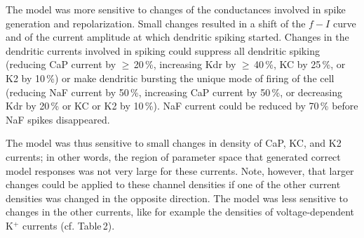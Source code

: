 \documentclass[12pt]{article}
\begin{document}
The model was more sensitive to changes of the conductances involved in spike generation and repolarization.
Small changes resulted in a shift of the $f-I$ curve and of the current amplitude at which dendritic spiking started.
Changes in the dendritic currents involved in spiking could suppress all dendritic spiking (reducing CaP current by
$\geq$\,20\,\%, increasing Kdr by $\geq$\,40\,\%, KC by 25\,\%, or K2 by 10\,\%) or make dendritic bursting the unique mode of firing of the cell (reducing NaF current by 50\,\%, increasing CaP current by 50\,\%, or decreasing Kdr by 20\,\% or KC or K2 by 10\,\%). NaF current could be reduced by 70\,\% before NaF spikes disappeared.

The model was thus sensitive to small changes in density of CaP, KC, and K2 currents; in other words, the region of
parameter space that generated correct model responses was not very large for these currents. Note, however, that
larger changes could be applied to these channel densities if one of the other current densities was changed in the opposite direction. The model was less sensitive to changes in the other currents, like for example the densities of voltage-dependent K$^+$ currents (cf. Table\,2).



\end{document}
